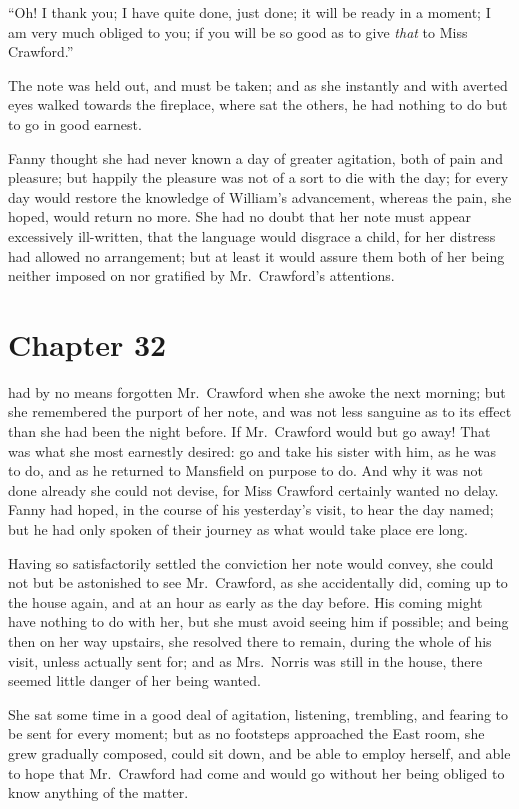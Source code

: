 ``Oh!  I thank you; I have quite done, just done; it will
be ready in a moment; I am very much obliged to you;
if you will be so good as to give \emph{that} to Miss Crawford.''

The note was held out, and must be taken; and as she
instantly and with averted eyes walked towards the fireplace,
where sat the others, he had nothing to do but to go
in good earnest.

Fanny thought she had never known a day of greater agitation,
both of pain and pleasure; but happily the pleasure
was not of a sort to die with the day; for every day
would restore the knowledge of William's advancement,
whereas the pain, she hoped, would return no more.
She had no doubt that her note must appear excessively
ill-written, that the language would disgrace a child,
for her distress had allowed no arrangement; but at least
it would assure them both of her being neither imposed
on nor gratified by Mr.\ Crawford's attentions.



\chapter{Chapter 32}

 had by no means forgotten Mr.\ Crawford when she
awoke the next morning; but she remembered the purport
of her note, and was not less sanguine as to its effect
than she had been the night before.  If Mr.\ Crawford would
but go away!  That was what she most earnestly desired:
go and take his sister with him, as he was to do,
and as he returned to Mansfield on purpose to do.
And why it was not done already she could not devise,
for Miss Crawford certainly wanted no delay.  Fanny had hoped,
in the course of his yesterday's visit, to hear the day named;
but he had only spoken of their journey as what would take
place ere long.

Having so satisfactorily settled the conviction her note
would convey, she could not but be astonished to see
Mr.\ Crawford, as she accidentally did, coming up to the
house again, and at an hour as early as the day before.
His coming might have nothing to do with her, but she
must avoid seeing him if possible; and being then
on her way upstairs, she resolved there to remain,
during the whole of his visit, unless actually sent for;
and as Mrs.\ Norris was still in the house, there seemed
little danger of her being wanted.

She sat some time in a good deal of agitation, listening,
trembling, and fearing to be sent for every moment;
but as no footsteps approached the East room, she grew
gradually composed, could sit down, and be able to
employ herself, and able to hope that Mr.\ Crawford had come
and would go without her being obliged to know anything of the
matter.

